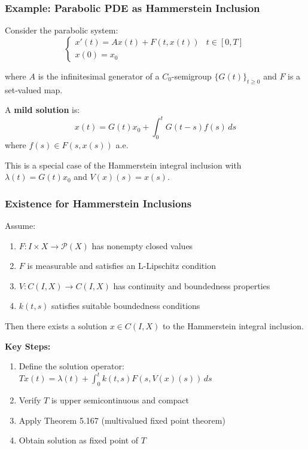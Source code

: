 \documentclass[aspectratio=169,10pt]{beamer}
\begin{document}
\begin{frame}
\frametitle{Example: Parabolic PDE as Hammerstein Inclusion}

\begin{example}
Consider the parabolic system:
\[
\begin{cases}
x'(t) = Ax(t) + F(t, x(t)) & t \in [0,T] \\
x(0) = x_0
\end{cases}
\]

where $A$ is the infinitesimal generator of a $C_0$-semigroup $\{G(t)\}_{t \geq 0}$ and $F$ is a set-valued map.

A \textbf{mild solution} is:
\[
x(t) = G(t)x_0 + \int_0^t G(t-s)f(s) \, ds
\]
where $f(s) \in F(s, x(s))$ a.e.
\end{example}

\vspace{0.5cm}

This is a special case of the Hammerstein integral inclusion with $\lambda(t) = G(t)x_0$ and $V(x)(s) = x(s)$.

\end{frame}

\begin{frame}
\frametitle{Existence for Hammerstein Inclusions}

\begin{theorem}
Assume:
\begin{enumerate}
    \item $F: I \times X \to \mathcal{P}(X)$ has nonempty closed values
    \item $F$ is measurable and satisfies an L-Lipschitz condition
    \item $V: C(I,X) \to C(I,X)$ has continuity and boundedness properties
    \item $k(t,s)$ satisfies suitable boundedness conditions
\end{enumerate}

Then there exists a solution $x \in C(I, X)$ to the Hammerstein integral inclusion.
\end{theorem}

\vspace{0.5cm}

\textbf{Key Steps:}
\begin{enumerate}
    \item Define the solution operator: $Tx(t) = \lambda(t) + \int_0^t k(t,s)F(s,V(x)(s))\,ds$
    \item Verify $T$ is upper semicontinuous and compact
    \item Apply Theorem 5.167 (multivalued fixed point theorem)
    \item Obtain solution as fixed point of $T$
\end{enumerate}

\end{frame}
\end{document}
